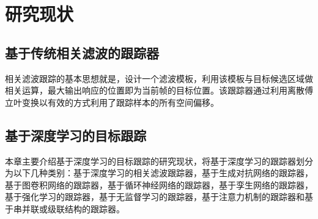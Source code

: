 \chapter{研究现状} \label{chap:related}

\section{基于传统相关滤波的跟踪器}
相关滤波跟踪的基本思想就是，设计一个滤波模板，利用该模板与目标候选区域做相关运算，最大输出响应的位置即为当前帧的目标位置。该跟踪器通过利用离散傅立叶变换以有效的方式利用了跟踪样本的所有空间偏移。

\section{基于深度学习的目标跟踪}
本章主要介绍基于深度学习的目标跟踪的研究现状，将基于深度学习的跟踪器划分为以下几种类别：基于深度学习的相关滤波跟踪器，基于生成对抗网络的跟踪器，基于图卷积网络的跟踪器，基于循环神经网络的跟踪器，基于孪生网络的跟踪器，基于强化学习的跟踪器，基于无监督学习的跟踪器，基于注意力机制的跟踪器和基于串并联或级联结构的跟踪器。

